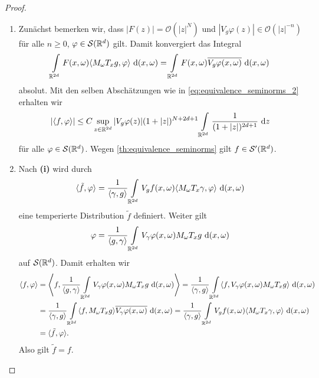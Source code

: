 \begin{proof}
	\begin{enumerate}[label =\textbf{(\roman*)}]
		\item 
		Zunächst bemerken wir, dass $ |F(z) | = \mathcal{O}(|z|^N) $ und 
		$ |V_g \varphi(z)| \in \mathcal{O}(|z|^{-n}) $ für alle $ n \geq 0 $, $ \varphi \in \mathcal{S}(\mathbb{R}^d) $ gilt. Damit konvergiert das Integral
		\begin{align*}
		\int \limits_{\mathbb{R}^{2d}}
		F(x,\omega) \langle M_\omega T_x g , \varphi\rangle \text{ d} (x,\omega)
		=
		\int \limits_{\mathbb{R}^{2d}}
		F(x,\omega) \overline{V_g  \varphi(x,\omega)} \text{ d} (x,\omega)
		\end{align*}
		absolut. Mit den selben Abschätzungen wie in \eqref{eq:equivalence_seminorms_2} erhalten wir
		\begin{align*}
		|\langle f , \varphi \rangle |
		\leq 
		C \sup \limits_{  z \in \mathbb{R}^{2d}}
		|V_g \varphi(z) | (1 + |z|)^{N+2d+1} \int \limits_{\mathbb{R}^{2d}} \frac{1}{(1+ |z|)^{2d + 1}} \text{ d} z
		\end{align*}
		für alle $ \varphi \in \mathcal{S}(\mathbb{R}^d) $.
		Wegen \ref{th:equivalence_seminorms} gilt $ f \in \mathcal{S}^\prime(\mathbb{R}^d) $.
		
		\item
		Nach \textbf{(i)} wird durch
		\begin{align*}
		\langle \tilde{f}, \varphi \rangle 
		= 
		\frac{1}{\langle \gamma,g \rangle} 
		\int \limits_{\mathbb{R}^{2d}}
		V_g f(x,\omega) \langle M_\omega T_x \gamma ,\varphi \rangle
		\text{ d} (x,\omega)
		\end{align*}
		eine temperierte Distribution $ \tilde{f} $ definiert. 
		Weiter gilt 
		\begin{align*}
		\varphi
		=
		\frac{1}{\langle g, \gamma \rangle}
		\int \limits_{\mathbb{R}^{2d}}
		V_\gamma \varphi(x,\omega) M_\omega T_x g \text{ d} (x,\omega)
		\end{align*}
		auf $ \mathcal{S}(\mathbb{R}^d) $. Damit erhalten wir
		\begin{align*}
		\langle f , \varphi \rangle
		&=
		\left\langle f,  \frac{1}{\langle g, \gamma \rangle}
		\int \limits_{\mathbb{R}^{2d}}
		V_\gamma \varphi(x,\omega) M_\omega T_x g \text{ d} (x,\omega)
		\right\rangle
		=
		\frac{1}{\langle \gamma, g \rangle}
		\int \limits_{\mathbb{R}^{2d}}
		\langle f, V_\gamma \varphi(x,\omega) M_\omega T_x g \rangle \text{ d} (x, \omega)\\
		&=
		\frac{1}{\langle \gamma, g \rangle}
		\int \limits_{\mathbb{R}^{2d}}
		\langle f,  M_\omega T_x g \rangle \overline{V_\gamma \varphi(x,\omega)}\text{ d} (x, \omega)
		=
		\frac{1}{\langle \gamma, g \rangle}
		\int \limits_{\mathbb{R}^{2d}}
		V_g f(x,\omega) \langle M_\omega T_x \gamma, \varphi \rangle \text{ d} (x, \omega)\\
		&=
		\langle \tilde{f}, \varphi \rangle.
		\end{align*}
		Also gilt $ \tilde{f} = f $.
		
	\end{enumerate}
\end{proof}